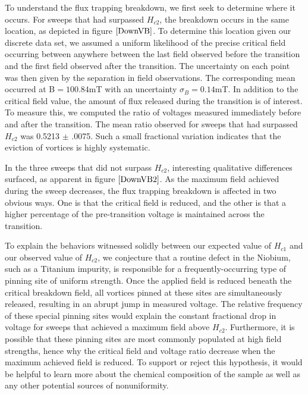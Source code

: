 \documentclass[twocolumn,aps,prl]{revtex4-1} %
\begin{document}
To understand the flux trapping breakdown, we first seek to determine where it occurs. For sweeps that had surpassed $H_{c2}$, the breakdown occurs in the same location, as depicted in figure $\ref{DownVB}$. To determine this location given our discrete data set, we assumed a uniform likelihood of the precise critical field occurring between anywhere between the last field observed before the transition and the first field observed after the transition. The uncertainty on each point was then given by the separation in field observations. The corresponding mean occurred at B$ = 100.84$mT with an uncertainty $\sigma_B = 0.14$mT. In addition to the critical field value, the amount of flux released during the transition is of interest. To measure this, we computed the ratio of voltages measured immediately before and after the transition. The mean ratio observed for sweeps that had surpassed $H_{c2}$ was 0.5213 $\pm$ .0075. Such a small fractional variation indicates that the eviction of vortices is highly systematic.

In the three sweeps that did not surpass $H_{c2}$, interesting qualitative differences surfaced, as apparent in figure $\ref{DownVB2}$. As the maximum field achieved during the sweep decreases, the flux trapping breakdown is affected in two obvious ways. One is that the critical field is reduced, and the other is that a higher percentage of the pre-transition voltage is maintained across the transition. 

To explain the behaviors witnessed solidly between our expected value of $H_{c1}$ and our observed value of $H_{c2}$, we conjecture that a routine defect in the Niobium, such as a Titanium impurity, is responsible for a frequently-occurring type of pinning site of uniform strength. Once the applied field is reduced beneath the critical breakdown field, all vortices pinned at these sites are simultaneously released, resulting in an abrupt jump in measured voltage. The relative frequency of these special pinning sites would explain the constant fractional drop in voltage for sweeps that achieved a maximum field above $H_{c2}$. Furthermore, it is possible that these pinning sites are most commonly populated at high field strengths, hence why the critical field and voltage ratio decrease when the maximum achieved field is reduced. To support or reject this hypothesis, it would be helpful to learn more about the chemical composition of the sample as well as any other potential sources of nonuniformity.

\end{document}
